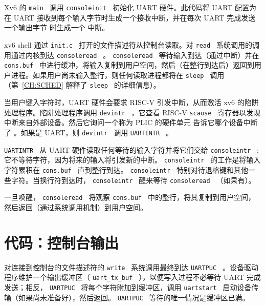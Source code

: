 Xv6 的  {    \tt    main   }  调用  {    \tt    consoleinit   } 
    初始化 UART 硬件。此代码将 UART 配置为在 UART 接收到每个输入字节时生成一个接收中断，并在每次 UART 完成发送一个输出字节        时生成一个        中断。  

xv6 shell 通过  {    \tt    init.c   }         打开的文件描述符从控制台读取。对  {    \tt    read   }  系统调用的调用通过内核到达  {    \tt    consoleread   }         。  {    \tt    consoleread   }  等待输入到达（通过中断）并在  {    \tt    cons.buf   }  中进行缓冲，将输入复制到用户空间，然后（在整行到达后）返回到用户进程。如果用户尚未输入整行，则任何读取进程都将在
  {    \tt    sleep   }  调用
      （第~\ref{CH:SCHED}    解释了  {    \tt    sleep   }  的详细信息）。  

当用户键入字符时，UART 硬件会要求 RISC-V 引发中断，从而激活 xv6 的陷阱处理程序。陷阱处理程序调用  {    \tt    devintr   } 
    ，它查看 RISC-V  {    \tt   scause   }  寄存器以发现中断来自外部设备。然后它询问一个称为 PLIC 的硬件单元
    \cite{riscv:priv}    告诉它哪个设备中断了
       。如果是 UART，则  {    \tt    devintr   }  调用  {    \tt    UARTINTR   }  。  

 {    \tt    UARTINTR   } 
     从 UART 硬件读取任何等待的输入字符并将它们交给  {    \tt    consoleintr   } 
   ;它不等待字符，因为将来的输入将引发新的中断。  {    \tt    consoleintr   }  的工作是将输入字符累积在
  {    \tt    cons.buf   }  直到整行到达。
  {    \tt    consoleintr   }  特别对待退格键和其他一些字符。当换行符到达时， {    \tt    consoleintr   }  醒来等待  {    \tt    consoleread   } （如果有）。  

一旦唤醒，  {    \tt    consoleread   }  将观察  {    \tt    cons.buf   }  中的整行，将其复制到用户空间，然后返回（通过系统调用机制）到用户空间。  

   \section{代码：控制台输出  }     

对连接到控制台的文件描述符的  {    \tt    write   }  系统调用最终到达
  {    \tt    UARTPUC   } 
        。设备驱动程序维护一个输出缓冲区（  {    \tt    uart\_tx\_buf   }  ），以便写入过程不必等待 UART 完成发送；相反， {    \tt    UARTPUC   }  将每个字符附加到缓冲区，调用  {    \tt    uartstart   }  启动设备传输（如果尚未准备好），然后返回。  {    \tt    UARTPUC   }  等待的唯一情况是缓冲区已满。  

